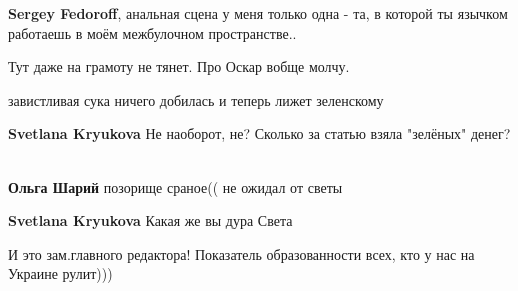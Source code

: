 \begin{itemize}
\begin{itemize}
\textbf{Sergey Fedoroff}, анальная сцена у меня только одна - та, в которой ты язычком работаешь в моём межбулочном пространстве..

 
Тут даже на грамоту не тянет. Про Оскар вобще молчу.

 
завистливая сука ничего добилась и теперь лижет зеленскому

 
\textbf{Svetlana Kryukova} Не наоборот, не? Сколько за статью взяла "зелёных" денег?🤣🤣🤣🤦🏻‍♂️

 
\textbf{Ольга Шарий} позорище сраное(( не ожидал от светы

 
\textbf{Svetlana Kryukova} Какая же вы дура Света

 
И это зам.главного редактора! Показатель образованности всех, кто у нас на Украине рулит)))

 

\end{itemize}
\end{itemize}
